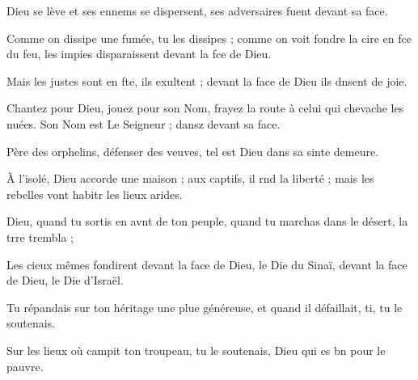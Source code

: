 \item Dieu se lève et ses ennems se dispersent,\psstar{} ses adversaires fuent devant sa face.
\item Comme on dissipe une fumée, tu les dissipes ;\pscross{} comme on voit fondre la cire en fce du feu,\psstar{} les impies disparaissent devant la fce de Dieu.
\item Mais les justes sont en fte, ils exultent ;\psstar{} devant la face de Dieu ils dnsent de joie.
\item Chantez pour Dieu, jouez pour son Nom,\pscross{} frayez la route à celui qui chevache les nuées.\psstar{} Son Nom est Le Seigneur ; dansz devant sa face.
\item Père des orphelins, défenser des veuves,\psstar{} tel est Dieu dans sa sinte demeure.
\item À l’isolé, Dieu accorde une maison ;\pscross{} aux captifs, il rnd la liberté ;\psstar{} mais les rebelles vont habitr les lieux arides.
\item Dieu, quand tu sortis en avnt de ton peuple,\psstar{} quand tu marchas dans le désert, la trre trembla ;
\item Les cieux mêmes fondirent\pscross{} devant la face de Dieu, le Die du Sinaï,\psstar{} devant la face de Dieu, le Die d’Israël.
\item Tu répandais sur ton héritage une plue généreuse,\psstar{} et quand il défaillait, ti, tu le soutenais.
\item Sur les lieux où campit ton troupeau,\psstar{} tu le soutenais, Dieu qui es bn pour le pauvre.